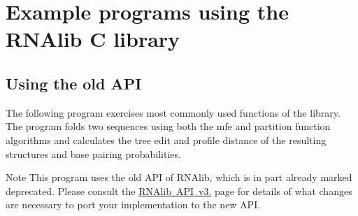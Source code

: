 \hypertarget{mp_example_example_c}{}\section{Example programs using the R\+N\+Alib C library}\label{mp_example_example_c}
\hypertarget{mp_example_examples_c_old_API}{}\subsection{Using the \textquotesingle{}old\textquotesingle{} A\+PI}\label{mp_example_examples_c_old_API}
The following program exercises most commonly used functions of the library. The program folds two sequences using both the mfe and partition function algorithms and calculates the tree edit and profile distance of the resulting structures and base pairing probabilities.

\begin{DoxyNote}{Note}
This program uses the old A\+PI of R\+N\+Alib, which is in part already marked deprecated. Please consult the \mbox{\hyperlink{newAPI}{R\+N\+Alib A\+PI v3.}} page for details of what changes are necessary to port your implementation to the new A\+PI.
\end{DoxyNote}


